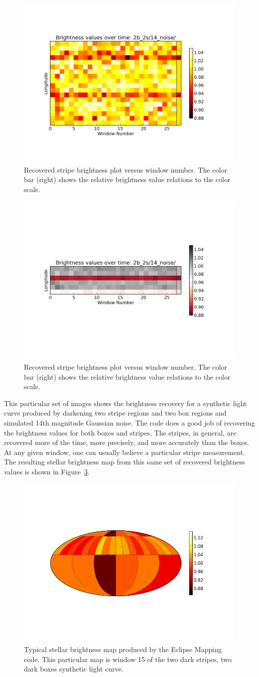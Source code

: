 \begin{figure}[h]
	\centering
	\includegraphics[width=.5\textwidth]{images/2b_2s/14_noise/box_plot.png}
	\caption{Recovered stripe brightness plot versus window number. The color bar (right) shows the relative brightness value relations to the color scale.}
	\label{box_plot}
\end{figure}
\begin{figure}[h]
	\centering
	\includegraphics[width=.5\textwidth]{images/2b_2s/14_noise/stripe_plot.png}
	\caption{Recovered stripe brightness plot versus window number. The color bar (right) shows the relative brightness value relations to the color scale.}
	\label{stripe_plot}
\end{figure}

This particular set of images shows the brightness recovery for a synthetic light curve produced by darkening two stripe regions and two box regions and simulated 14th magnitude Gaussian noise. The code does a good job of recovering the brightness values for both boxes and stripes. The stripes, in general, are recovered more of the time, more precisely, and more accurately than the boxes. At any given window, one can usually believe a particular stripe measurement. The resulting stellar brightness map from this same set of recovered brightness values is shown in Figure~\ref{bright_map}.

\begin{figure}[h]
	\centering
	\includegraphics[width=.5\textwidth]{images/2b_2s/14_noise/brightness_map_w15.png}
	\caption{Typical stellar brightness map produced by the Eclipse Mapping code. This particular map is window 15 of the two dark stripes, two dark boxes synthetic light curve.}
	\label{bright_map}
\end{figure}